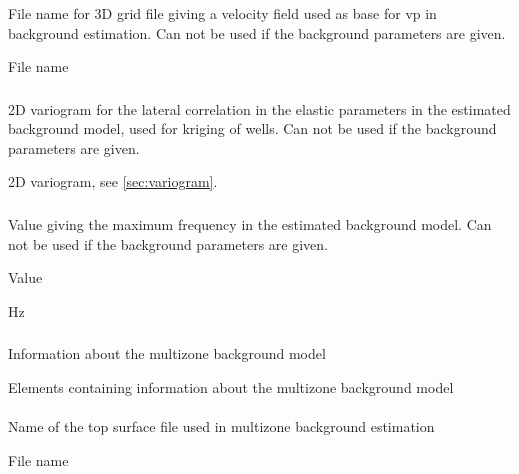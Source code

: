 \subsubsection{}
 \slist
   \item \Description File name for 3D grid file giving a velocity field used as base for vp in background estimation. Can not be used if the background parameters are given.
   \item \Argument File name
   \item \Default
 \elist

\subsubsection{}
 \slist
   \item \Description 2D variogram for the lateral correlation in the elastic parameters in the estimated background model, used for kriging of wells. Can not be used if the background parameters are given.
   \item \Argument 2D variogram, see \autoref{sec:variogram}.
   \item \Default
 \elist

\subsubsection{}
 \slist
   \item \Description Value giving the maximum frequency in the estimated background model. Can not be used if the background parameters are given.
   \item \Argument Value
   \item {} Hz
 \elist

\subsubsection{}
 \slist
   \item \Description  Information about the multizone background model
   \item \Argument Elements containing information about the multizone background model
   \item \Default
 \elist

\paragraph{}
 \slist
   \item \Description Name of the top surface file used in multizone background estimation
   \item \Argument File name
   \item \Default
 \elist


